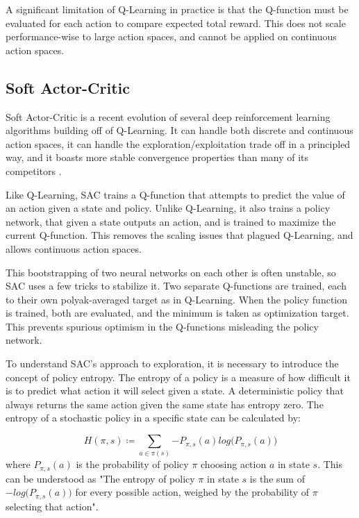 
A significant limitation of Q-Learning in practice is that the Q-function must be evaluated for each action to compare expected total reward. This does not scale performance-wise to large action spaces, and cannot be applied on continuous action spaces.

\subsection{Soft Actor-Critic}

Soft Actor-Critic is a recent evolution of several deep reinforcement learning algorithms building off of Q-Learning. It can handle both discrete and continuous action spaces, it can handle the exploration/exploitation trade off in a principled way, and it boasts more stable convergence properties than many of its competitors \cite{SAC_main}.

Like Q-Learning, SAC trains a Q-function that attempts to predict the value of an action given a state and policy. Unlike Q-Learning, it also trains a policy network, that given a state outputs an action, and is trained to maximize the current Q-function. This removes the scaling issues that plagued Q-Learning, and allows continuous action spaces.

This bootstrapping of two neural networks on each other is often unstable, so SAC uses a few tricks to stabilize it. Two separate Q-functions are trained, each to their own polyak-averaged target as in Q-Learning. When the policy function is trained, both are evaluated, and the minimum is taken as optimization target. This prevents spurious optimism in the Q-functions misleading the policy network.

To understand SAC's approach to exploration, it is necessary to introduce the concept of policy entropy. The entropy of a policy is a measure of how difficult it is to predict what action it will select given a state. A deterministic policy that always returns the same action given the same state has entropy zero. The entropy of a stochastic policy in a specific state can be calculated by:

\begin{equation}
    H(\pi, s) \coloneqq \sum_{a \in \pi(s)}{-P_{\pi, s}(a) log\big(P_{\pi, s}(a)\big)}
\end{equation} where $P_{\pi, s}(a)$ is the probability of policy $\pi$ choosing action $a$ in state $s$. This can be understood as "The entropy of policy $\pi$ in state $s$ is the sum of $-log\big(P_{\pi, s}(a)\big)$ for every possible action, weighed by the probability of $\pi$ selecting that action".

